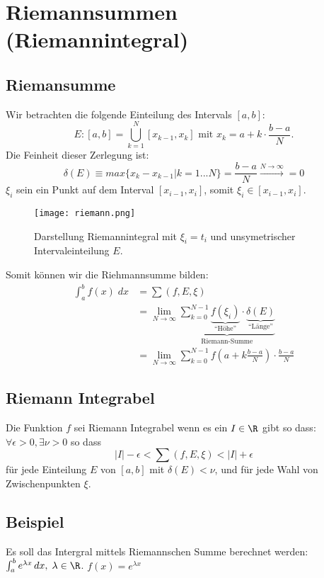 \section{Riemannsummen (Riemannintegral)}
\subsection{Riemansumme}
Wir betrachten die folgende Einteilung des Intervals $[a,b]$:\[
E: [a,b] = \bigcup_{k=1}^{N}[x_{k-1}, x_k] \text{ mit } x_k = a + k \cdot \frac{b-a}{N}.
\]
Die Feinheit dieser Zerlegung ist:\[
\delta(E) \equiv max\{x_k - x_{k-1}|k = 1...N\} = \frac{b-a}{N} \xrightarrow{N \to \infty} = 0
\]
$\xi_i$ sein ein Punkt auf dem Interval $[x_{i-1}, x_i]$, somit $\xi_i \in[x_{i-1}, x_i]$.\\

\begin{figure}
	\texttt{[image: riemann.png]}
	\caption[Bildunterschrift]{Darstellung Riemannintegral mit $\xi_i = t_i$ und unsymetrischer Intervaleinteilung $E$.}
\end{figure}

Somit können wir die Riehmannsumme bilden:
\begin{align*}
\int_a^b f(x)\;dx &=\sum (f,E,\xi)\\
&= \lim_{N \to \infty} \underbrace{\sum_{k=0}^{N-1}
\underbrace{f(\xi_i)}_{\text{``Höhe''}} \cdot
\underbrace{\delta(E)}_{\text{``Länge''}}}_{\text{Riemann-Summe}}\\
&= \lim_{N \to \infty} \sum_{k=0}^{N-1} {f(a +
k\frac{b-a}{N})} \cdot \frac{b-a}{N}
\end{align*}


\subsection{Riemann Integrabel}
Die Funktion $f$ sei Riemann Integrabel wenn es ein $I \in \R$ gibt so dass: $\forall \epsilon > 0, \exists \nu > 0$ so dass \[
|I| - \epsilon < \sum (f,E,\xi) < |I| + \epsilon
\]
für jede Einteilung $E$ von $[a,b]$ mit $\delta(E) < \nu$, und für jede Wahl von Zwischenpunkten $\xi$.

\subsection{Beispiel}
Es soll das Intergral mittels Riemannschen Summe berechnet werden: $\int_a^b
e^{\lambda x}\,dx, \; \lambda \in \R$. $f(x) = e^{\lambda x}$


